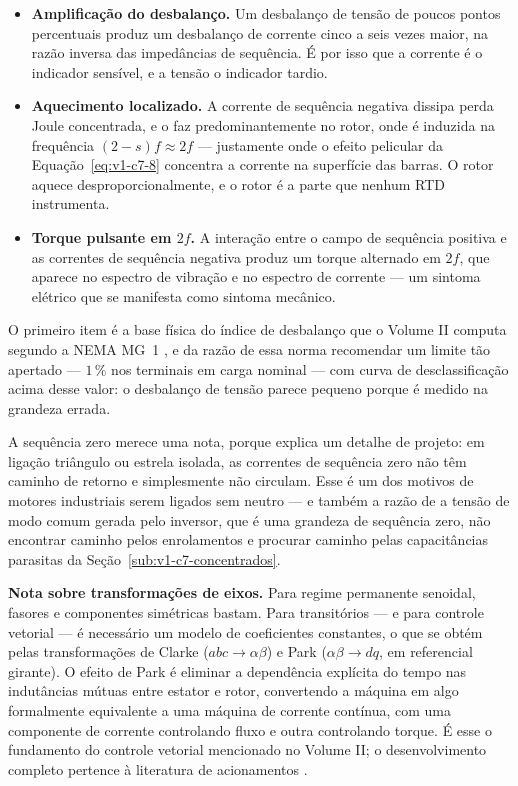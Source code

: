 \documentclass[12pt,a4paper]{article}
\numberwithin{equation}{section}
\numberwithin{table}{section}
\numberwithin{figure}{section}
\begin{document}
\begin{itemize}
	\item \textbf{Amplificação do desbalanço.} Um desbalanço de tensão de
	poucos pontos percentuais produz um desbalanço de corrente cinco a seis
	vezes maior, na razão inversa das impedâncias de sequência. É por isso que
	a corrente é o indicador sensível, e a tensão o indicador tardio.
	\item \textbf{Aquecimento localizado.} A corrente de sequência negativa
	dissipa perda Joule concentrada, e o faz predominantemente no rotor, onde
	é induzida na frequência $(2-s)f \approx 2f$ --- justamente onde o efeito
	pelicular da Equação~\eqref{eq:v1-c7-8} concentra a corrente na superfície
	das barras. O rotor aquece desproporcionalmente, e o rotor é a parte que
	nenhum RTD instrumenta.
	\item \textbf{Torque pulsante em $2f$.} A interação entre o campo de
	sequência positiva e as correntes de sequência negativa produz um torque
	alternado em $2f$, que aparece no espectro de vibração e no espectro de
	corrente --- um sintoma elétrico que se manifesta como sintoma mecânico.
\end{itemize}

O primeiro item é a base física do índice de desbalanço que o Volume II
computa segundo a NEMA MG~1 \cite{nemamg1}, e da razão de essa norma
recomendar um limite tão apertado --- $1\,\%$ nos terminais em carga nominal
--- com curva de desclassificação acima desse valor: o desbalanço de tensão
parece pequeno porque é medido na grandeza errada.

A sequência zero merece uma nota, porque explica um detalhe de projeto: em
ligação triângulo ou estrela isolada, as correntes de sequência zero não têm
caminho de retorno e simplesmente não circulam. Esse é um dos motivos de
motores industriais serem ligados sem neutro --- e também a razão de a tensão
de modo comum gerada pelo inversor, que é uma grandeza de sequência zero, não
encontrar caminho pelos enrolamentos e procurar caminho pelas capacitâncias
parasitas da Seção~\ref{sub:v1-c7-concentrados}.

\textbf{Nota sobre transformações de eixos.} Para regime permanente
senoidal, fasores e componentes simétricas bastam. Para transitórios --- e para
controle vetorial --- é necessário um modelo de coeficientes constantes, o que
se obtém pelas transformações de Clarke ($abc \to \alpha\beta$) e Park
($\alpha\beta \to dq$, em referencial girante). O efeito de Park é eliminar a
dependência explícita do tempo nas indutâncias mútuas entre estator e rotor,
convertendo a máquina em algo formalmente equivalente a uma máquina de corrente
contínua, com uma componente de corrente controlando fluxo e outra controlando
torque. É esse o fundamento do controle vetorial mencionado no
Volume II; o desenvolvimento completo pertence à literatura de acionamentos
\cite{fitzgerald2003}.
\end{document}
